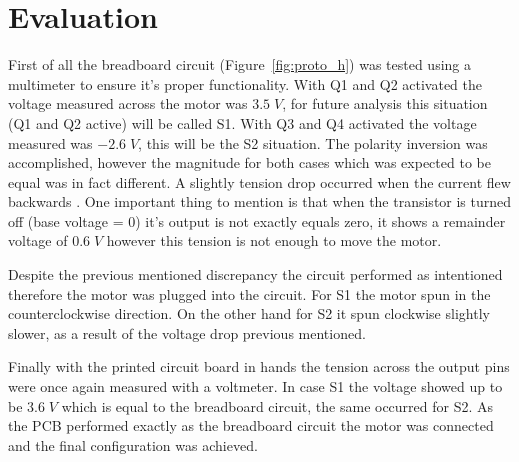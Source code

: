 \section{\textbf{Evaluation}}\label{sec:5}

	First of all the breadboard circuit (Figure~\ref{fig:proto_h}) was tested using a multimeter to ensure it's proper functionality. With Q1 and Q2 activated the voltage measured across the motor was $3.5\;V$, for future analysis this situation (Q1 and Q2 active) will be called S1. With Q3 and Q4 activated the voltage measured was $-2.6\;V$, this will be the S2 situation. The polarity inversion was accomplished, however the magnitude for both cases which was expected to be equal was in fact different. A slightly tension drop occurred when the current flew backwards . One important thing to mention is that when the transistor is turned off (base voltage = 0) it's output is not exactly equals zero, it shows a remainder voltage of $0.6\;V$ however this tension is not enough to move the motor.
	
	Despite the previous mentioned discrepancy the circuit performed as intentioned therefore the motor was plugged into the circuit. For S1 the motor spun in the counterclockwise direction. On the other hand for S2 it spun clockwise slightly slower, as a result of the voltage drop previous mentioned.
	
	Finally with the printed circuit board in hands the tension across the output pins were once again measured with a voltmeter. In case S1 the voltage showed up to be $3.6\;V$ which is equal to the breadboard circuit, the same occurred for S2. As the PCB performed exactly as the breadboard circuit the motor was connected and the final configuration was achieved. 

